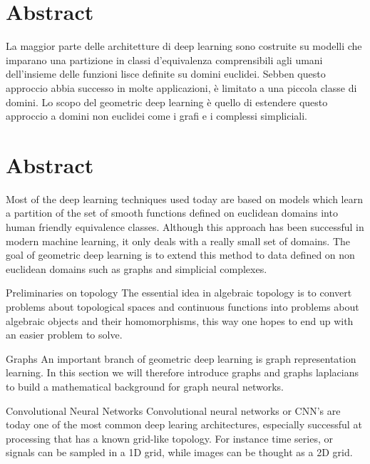 \documentclass[12pt,a4paper]{report}
\theoremstyle{plain}
\theoremstyle{definition}
\theoremstyle{remark}
\begin{document}
    \begin{titlepage}
        
    \end{titlepage}
    \chapter*{Abstract}
    La maggior parte delle architetture di deep learning sono costruite su modelli che imparano una partizione in classi d'equivalenza comprensibili agli umani
    dell'insieme delle funzioni lisce definite su domini euclidei.
    Sebben questo approccio abbia successo in molte applicazioni, è limitato a una piccola classe di domini.
    Lo scopo del geometric deep learning è quello di estendere questo approccio a domini non euclidei come i grafi e i complessi simpliciali.
    \chapter*{Abstract}
    Most of the deep learning techniques used today are based on models which learn a partition of the set of smooth functions defined on euclidean 
    domains into human friendly equivalence classes. Although this approach has been successful in modern machine learning, it only deals with a really 
    small set of domains. The goal of geometric deep learning is to extend this method to data defined on non euclidean domains such as graphs and simplicial
    complexes.
    \tableofcontents
    \newpage
    \begin{chapter}{Preliminaries on topology}
        \label{ch:1}
        The essential idea in algebraic topology is to convert problems about topological spaces and continuous functions into
        problems about algebraic objects and their homomorphisms, this way one hopes to end up with an easier problem to solve. 
        
    \end{chapter}
    \begin{chapter}{Graphs}
        \label{ch:2}
        An important branch of geometric deep learning is graph representation learning. In this section we will therefore
        introduce graphs and graphs laplacians to build a mathematical background for graph neural networks. 
        
    \end{chapter}
    \begin{chapter}{Convolutional Neural Networks}
        \label{ch:3}
        Convolutional neural networks or CNN's are today one of the most common deep learing architectures, especially successful at processing
        that has a known grid-like topology. For instance time series, or signals can be sampled in a 1D grid, while images can be thought as a 2D grid.
        
    \end{chapter}
\end{document}
